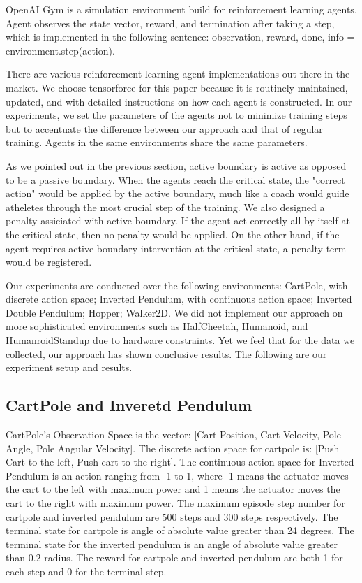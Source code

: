 \documentclass[journal]{IEEEtran}
\begin{document}
OpenAI Gym is a simulation environment build for reinforcement learning agents. Agent observes the state vector, reward, and termination after taking a step, which is implemented in the following sentence: observation, reward, done, info = environment.step(action).

There are various reinforcement learning agent implementations out there in the market. We choose tensorforce\cite{tensorforce} for this paper because it is routinely maintained, updated, and with detailed instructions on how each agent is constructed. In our experiments, we set the parameters of the agents not to minimize training steps but to accentuate the difference between our approach and that of regular training. Agents in the same environments share the same parameters.

As we pointed out in the previous section, active boundary is active as opposed to be a passive boundary. When the agents reach the critical state, the "correct action" would be applied by the active boundary, much like a coach would guide atheletes through the most crucial step of the training. We also designed a penalty assiciated with active boundary. If the agent act correctly all by itself at the critical state, then no penalty would be applied. On the other hand, if the agent requires active boundary intervention at the critical state, a penalty term would be registered. 

Our experiments are conducted over the following environments: CartPole, with discrete action space; Inverted Pendulum, with continuous action space; Inverted Double Pendulum; Hopper; Walker2D. We did not implement our approach on more sophisticated environments such as HalfCheetah, Humanoid, and HumanroidStandup due to hardware constraints. Yet we feel that for the data we collected, our approach has shown conclusive results. The following are our experiment setup and results.

\subsection{CartPole and Inveretd Pendulum}
CartPole's Observation Space is the vector: [Cart Position, Cart Velocity, Pole Angle, Pole Angular Velocity]. The discrete action space for cartpole is: [Push Cart to the left, Push cart to the right]. The continuous action space for Inverted Pendulum is an action ranging from -1 to 1, where -1 means the actuator moves the cart to the left with maximum power and 1 means the actuator moves the cart to the right with maximum power. The maximum episode step number for cartpole and inverted pendulum are 500 steps and 300 steps respectively. The terminal state for cartpole is angle of absolute value greater than 24 degrees. The terminal state for the inverted pendulum is an angle of absolute value greater than 0.2 radius. The reward for cartpole and inverted pendulum are both 1 for each step and 0 for the terminal step. 
\end{document}
